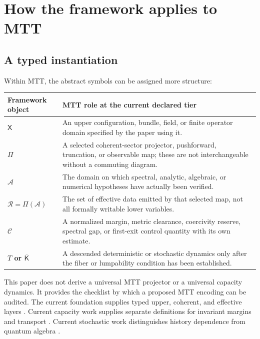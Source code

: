 \documentclass[11pt]{article}
\newcommand{\X}{\mathsf X}
\newcommand{\A}{\mathcal A}
\newcommand{\Rset}{\mathcal R}
\newcommand{\K}{\mathsf K}
\newcommand{\Ccap}{\mathcal C}
\begin{document}
\section{How the framework applies to MTT}

\subsection{A typed instantiation}

Within MTT, the abstract symbols can be assigned more structure:
\begin{center}
\begingroup
\renewcommand{\arraystretch}{1.12}
\begin{tabularx}{\textwidth}{>{\raggedright\arraybackslash\bfseries}p{}>{\raggedright\arraybackslash}X}
\toprule
Framework object & MTT role at the current declared tier \\
\midrule
$\X$ & An upper configuration, bundle, field, or finite operator domain
specified by the paper using it. \\
$\Pi$ & A selected coherent-sector projector, pushforward, truncation, or
observable map; these are not interchangeable without a commuting diagram. \\
$\A$ & The domain on which spectral, analytic, algebraic, or numerical
hypotheses have actually been verified. \\
$\Rset=\Pi(\A)$ & The set of effective data emitted by that selected map,
not all formally writable lower variables. \\
$\Ccap$ & A normalized margin, metric clearance, coercivity reserve,
spectral gap, or first-exit control quantity with its own estimate. \\
$T$ or $\overline{\K}$ & A descended deterministic or stochastic dynamics
only after the fiber or lumpability condition has been established. \\
\bottomrule
\end{tabularx}
\endgroup
\end{center}

This paper does not derive a universal MTT projector or a universal capacity
dynamics.  It provides the checklist by which a proposed MTT encoding can be
audited.  The current foundation supplies typed upper, coherent, and
effective layers \cite{nero_foundations}.  Current capacity work supplies
separate definitions for invariant margins and transport
\cite{nero_capacity_invariant,nero_capacity_budget,nero_capacity_dynamics}.
Current stochastic work distinguishes history dependence from quantum
algebra \cite{nero_indivisible}.
\end{document}
